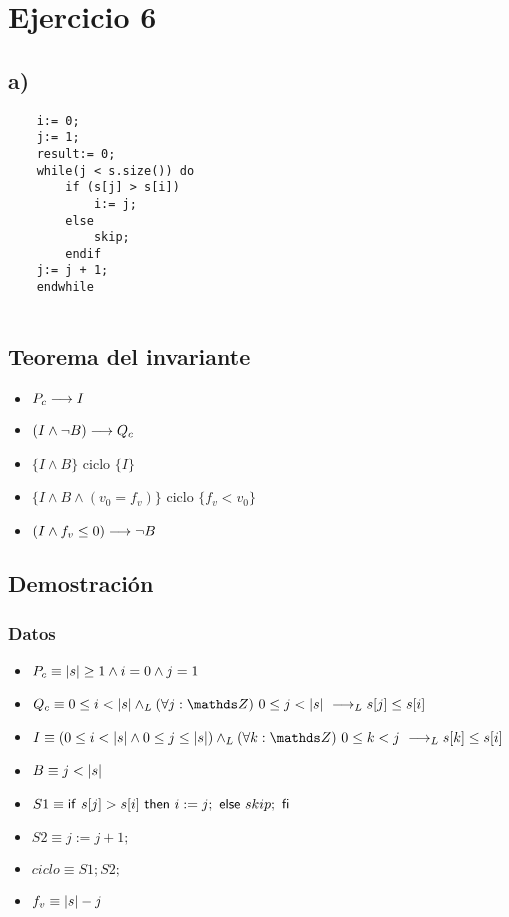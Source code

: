 \documentclass{article}
\begin{document}
\section*{Ejercicio 6}

\subsection*{a)}

\begin{verbatim}
    i:= 0;
    j:= 1;
    result:= 0;
    while(j < s.size()) do
        if (s[j] > s[i])
            i:= j;
        else
            skip;
        endif 
    j:= j + 1;
    endwhile
    
\end{verbatim}
\subsection*{Teorema del invariante}
\begin{itemize}
    \item $P_{c} \longrightarrow I$
    \item $(I \wedge \neg B) \longrightarrow Q_{c}$
    \item $\{I \wedge B\}$ ciclo $\{ I \}$
    \item $\{I \wedge B \wedge (v_{0} = f_{v})\}$ ciclo $\{f_{v} < v_{0}\}$
    \item $(I \wedge f_{v} \leq 0) \longrightarrow \neg B$
\end{itemize}


\subsection*{Demostración}
\subsubsection*{Datos}
\begin{itemize}
    \item $P_{c}    \equiv |s| \geq 1 \wedge i = 0 \wedge j = 1$
    \item $Q_{c}    \equiv 0 \leq i < \longitud{s} \yLuego \paraTodo{j}{0}{\longitud{s}} \implicaLuego s[j] \leq s[i]$
    \item $I        \equiv (0 \leq i < \longitud{s} \wedge 0 \leq j \leq \longitud{s}) \yLuego \paraTodo{k}{0}{j} \implicaLuego s[k] \leq s[i]$
    \item $B        \equiv j < |s|$
    \item $S1       \equiv \mathsf{if}\ s[j] > s[i]\ \mathsf{then}\ i:=j;\ \mathsf{else}\ skip;\ \mathsf{fi}$
    \item $S2       \equiv j:= j + 1;$
    \item $ciclo    \equiv S1;S2;$
    \item $f_{v}    \equiv |s|-j$
\end{itemize}
\end{document}
